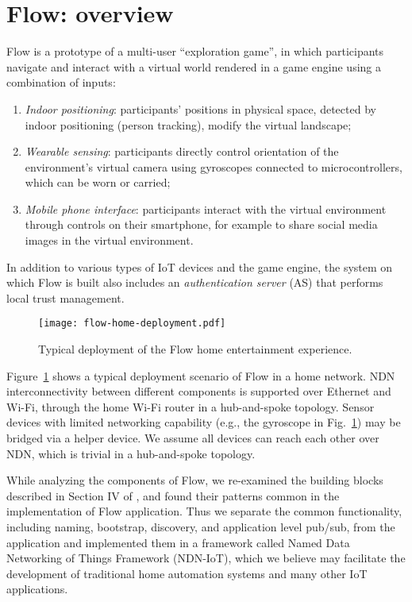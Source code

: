 \section{Flow: overview}
\label{sec:flow-overview}

Flow is a prototype of a multi-user ``exploration game'', in which participants navigate and interact with a virtual world rendered in a game engine using a combination of inputs: 
\begin{enumerate}
\item \textit{Indoor positioning}: participants' positions in physical space, detected by indoor positioning (person tracking), modify the virtual landscape;
\item \textit{Wearable sensing}: participants directly control orientation of the environment's virtual camera using gyroscopes connected to microcontrollers, which can be worn or carried; 
\item \textit{Mobile phone interface}: participants interact with the virtual environment through controls on their smartphone, for example to share social media images in the virtual environment.
\end{enumerate}
In addition to various types of IoT devices and the game engine, the system on which Flow is built also includes an \textit{authentication server} (AS) that performs local trust management.

\begin{figure}[!t]
\centering
\texttt{[image: flow-home-deployment.pdf]}
\caption{Typical deployment of the Flow home entertainment experience.}
\label{fig:flow-deployment}
\end{figure}

Figure~\ref{fig:flow-deployment} shows a typical deployment scenario of Flow in a home network.
NDN interconnectivity between different components is supported over Ethernet and Wi-Fi, through the home Wi-Fi router in a hub-and-spoke topology.
Sensor devices with limited networking capability (e.g., the gyroscope in Fig.~\ref{fig:flow-deployment}) may be bridged via a helper device.
We assume all devices can reach each other over NDN, which is trivial in a hub-and-spoke topology.

While analyzing the components of Flow, we re-examined the building blocks described in Section IV of \cite{ndn-iot}, and found their patterns common in the implementation of Flow application. 
Thus we separate the common functionality, including naming, bootstrap, discovery, and application level pub/sub, from the application and implemented them in a framework called Named Data Networking of Things Framework (NDN-IoT), which we believe may facilitate the development of traditional home automation systems and many other IoT applications. 
